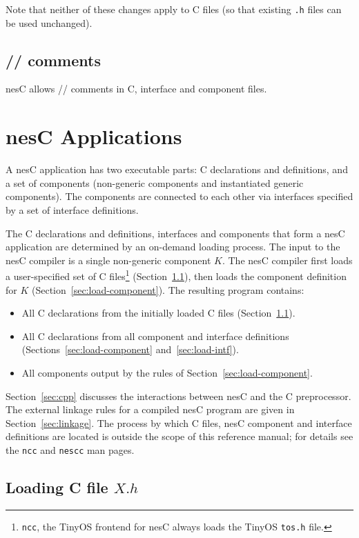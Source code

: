 \documentclass[11pt,letterpaper]{article}
\newcommand{\kw}[1]{{\tt #1}}
\newcommand{\file}[1]{{\tt #1}}
\newcommand{\nesc}{nesC\xspace}
\begin{document}
Note that neither of these changes apply to C files (so that existing
\file{.h} files can be used unchanged).

\subsection{// comments}

\nesc allows // comments in C, interface and component files.

\section{\nesc Applications}
\label{sec:app}

A \nesc application has two executable parts: C declarations and
definitions, and a set of components (non-generic components and
instantiated generic components). The components are connected
to each other via interfaces specified by a set of interface
definitions. 

The C declarations and definitions, interfaces and components that form a
\nesc application are determined by an on-demand loading process. The input
to the \nesc compiler is a single non-generic component $K$. The \nesc
compiler first loads a user-specified set of C files\footnote{\kw{ncc}, the
TinyOS frontend for \nesc always loads the TinyOS \file{tos.h} file.}
(Section~\ref{sec:load-c}), then loads the component definition for $K$
(Section~\ref{sec:load-component}). The resulting program contains:
\begin{itemize}
\item All C declarations from the initially loaded C files
(Section~\ref{sec:load-c}).
\item All C declarations from all component and interface definitions
(Sections~\ref{sec:load-component} and~\ref{sec:load-intf}).
\item All components output by the rules of Section~\ref{sec:load-component}.
\end{itemize}

Section~\ref{sec:cpp} discusses the interactions between \nesc and the C
preprocessor. The external linkage rules for a compiled \nesc program are
given in Section~\ref{sec:linkage}. The process by which C files, \nesc
component and interface definitions are located is outside the scope of
this reference manual; for details see the \file{ncc} and \kw{nescc} man
pages.


\subsection{Loading C file $X.h$}
\label{sec:load-c}
\end{document}
